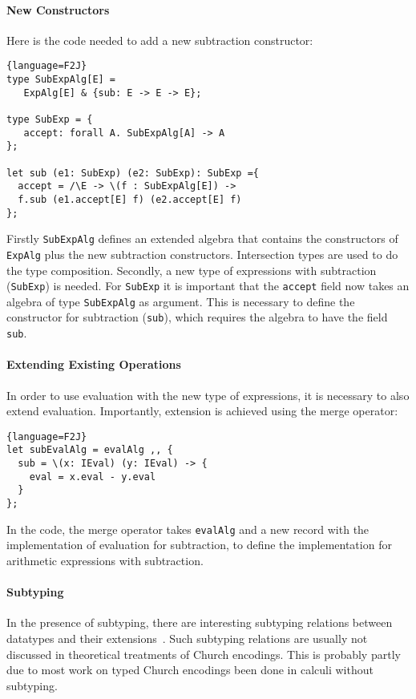 \paragraph{New Constructors} Here is the code needed to add a new subtraction constructor:

\begin{lstlisting}{language=F2J}
type SubExpAlg[E] =
   ExpAlg[E] & {sub: E -> E -> E};

type SubExp = {
   accept: forall A. SubExpAlg[A] -> A
};

let sub (e1: SubExp) (e2: SubExp): SubExp ={
  accept = /\E -> \(f : SubExpAlg[E]) ->
  f.sub (e1.accept[E] f) (e2.accept[E] f)
};
\end{lstlisting}

\noindent Firstly \lstinline{SubExpAlg} defines an extended algebra
that contains the constructors of \lstinline{ExpAlg} plus the new
subtraction constructors. Intersection types are used to do the type 
composition. Secondly, a new type of expressions with subtraction
(\lstinline{SubExp}) is needed. For \lstinline{SubExp} it is important
that the \lstinline{accept} field now takes an algebra of type
\lstinline{SubExpAlg} as argument. This is necessary to define the
constructor for subtraction (\lstinline{sub}), which requires the
algebra to have the field \lstinline{sub}. 


\paragraph{Extending Existing Operations} In order to use evaluation 
with the new type of expressions, it is necessary to also extend
evaluation. Importantly, extension is achieved using the merge operator:

\begin{lstlisting}{language=F2J}
let subEvalAlg = evalAlg ,, {
  sub = \(x: IEval) (y: IEval) -> {
    eval = x.eval - y.eval
  }
};
\end{lstlisting}

\noindent In the code, the merge operator takes \lstinline{evalAlg}
and a new record with the implementation of evaluation for
subtraction, to define the implementation for arithmetic expressions 
with subtraction.

\paragraph{Subtyping} In the presence of subtyping, there are
interesting subtyping relations between datatypes and their
extensions~\cite{oliveira09modular}.  Such subtyping relations are usually not
discussed in theoretical treatments of Church encodings. This is
probably partly due to most work on typed Church encodings been
done in calculi without subtyping.


